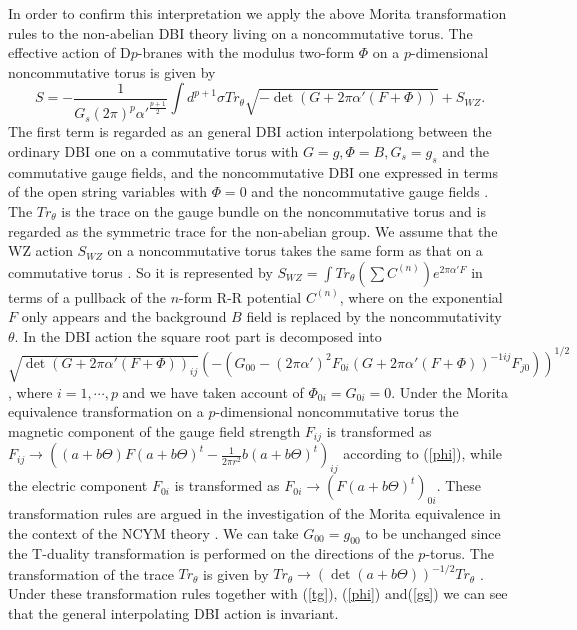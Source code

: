 \documentclass[12pt,a4paper]{article}
\newcommand{\al}{\alpha'}
\newcommand{\te}{\theta}
\newcommand{\Te}{\Theta}
\begin{document}
In order to confirm this interpretation we apply the above Morita 
transformation rules  to the non-abelian DBI theory
living on a noncommutative torus. The effective action of D$p$-branes
with the modulus two-form $\Phi$ on a $p$-dimensional noncommutative torus
is given by 
\begin{equation}
S = - \frac{1}{G_s(2\pi)^p\al^{\frac{p+1}{2}}}\int d^{p+1}\sigma 
Tr_{\te}\sqrt{-\det(G + 2\pi\al(F + \Phi))} + S_{WZ}.
\end{equation}
The first term is regarded as an general DBI action interpolationg between
the ordinary DBI one on a commutative torus with $G=g, \Phi=B, G_s=g_s$
and the commutative gauge fields, and the noncommutative DBI one 
expressed in terms of the open string variables with $\Phi=0$ and
the noncommutative gauge fields \cite{SW}. The $Tr_{\te}$
is the trace on the gauge bundle on the noncommutative torus and
is regarded as the symmetric trace \cite{AT} for the non-abelian group. 
We assume that the WZ action 
$S_{WZ}$ on a noncommutative torus takes the same form as that on a 
commutative torus \cite{LDS}. So it is represented by 
$S_{WZ}=\int Tr_{\te}(\sum C^{(n)})e^{2\pi\al F}$ in terms of a pullback
of the $n$-form R-R potential $C^{(n)}$, where on the exponential $F$ 
only appears and the background $B$ field is replaced by the 
noncommutativity $\te$. In the DBI action the square root part is 
decomposed into $\sqrt{\det(G+2\pi\al(F+\Phi))_{ij}} (-(G_{00}-
(2\pi\al)^2 F_{0i}(G+ 2\pi\al(F+\Phi))^{-1ij}F_{j0}))^{1/2}$, 
where $i=1,\cdots,p$ and we have taken account of
$\Phi_{0i}=G_{0i}=0$. Under the Morita equivalence
transformation on a $p$-dimensional noncommutative torus the magnetic
component of the gauge field strength $F_{ij}$ is transformed as
$F_{ij} \rightarrow ((a+b\Te)F(a+b\Te)^t -\frac{1}{2\pi r^2}b
(a+b\Te)^t)_{ij}$ according to (\ref{phi}), while the electric component
$F_{0i}$ is transformed as
$F_{0i} \rightarrow (F(a+b\Te)^t)_{0i}$.  
These transformation rules are argued in the investigation of the Morita
equivalence in the context of the NCYM theory \cite{BM,KS,AS,BMZ}.
We can take $G_{00}=g_{00}$ to be unchanged since the T-duality 
transformation is performed on the directions of the $p$-torus.
The transformation of the trace $Tr_{\te}$
is given by $Tr_{\te} \rightarrow (\det(a+b\Te))^{-1/2}Tr_{\te}$
\cite{HV}. Under these transformation rules together with (\ref{tg}),
(\ref{phi}) and(\ref{gs}) we can see that the general interpolating DBI
action is invariant.
\end{document}

